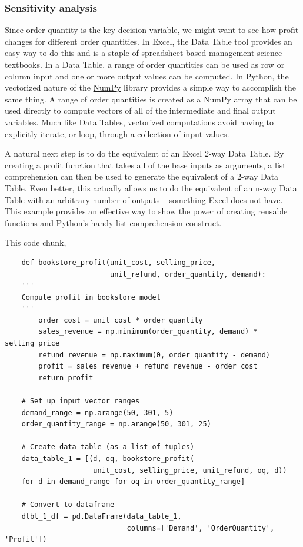 \documentclass[ited,blindrev]{informs3}              %
\begin{document}
\subsubsection{Sensitivity analysis}

Since order quantity is the key decision variable, we might want to see how profit changes for different order quantities. In Excel, the Data Table tool provides an easy way to do this and is a staple of spreadsheet based management science textbooks. In a Data Table, a range of order quantities can be used as row or column input and one or more output values can be computed. In Python, the vectorized nature of the \href{https://numpy.org/}{NumPy} library \cite{NumPy}provides a simple way to accomplish the same thing. A range of order quantities is created as a NumPy array that can be used directly to compute vectors of all of the intermediate and final output variables. Much like Data Tables, vectorized computations avoid having to explicitly iterate, or loop, through a collection of input values.

A natural next step is to do the equivalent of an Excel 2-way Data Table. By creating a profit function that takes all of the base inputs as arguments, a list comprehension can then be used to generate the equivalent of a 2-way Data Table. Even better, this actually allows us to do the equivalent of an n-way Data Table with an arbitrary number of outputs -- something Excel does not have. This example provides an effective way to show the power of creating reusable functions and Python's handy list comprehension construct.

This code chunk,

\begin{tcolorbox}[left=0mm]
\begin{verbatim}
	def bookstore_profit(unit_cost, selling_price, 
	                     unit_refund, order_quantity, demand):
	'''
	Compute profit in bookstore model
	'''
		order_cost = unit_cost * order_quantity
		sales_revenue = np.minimum(order_quantity, demand) * selling_price
		refund_revenue = np.maximum(0, order_quantity - demand)
		profit = sales_revenue + refund_revenue - order_cost
		return profit
	
	# Set up input vector ranges	
	demand_range = np.arange(50, 301, 5)
	order_quantity_range = np.arange(50, 301, 25)
	
	# Create data table (as a list of tuples)
	data_table_1 = [(d, oq, bookstore_profit(
	                 unit_cost, selling_price, unit_refund, oq, d)) 
	for d in demand_range for oq in order_quantity_range]
	
	# Convert to dataframe
	dtbl_1_df = pd.DataFrame(data_table_1, 
	                         columns=['Demand', 'OrderQuantity', 'Profit'])
	
\end{verbatim}
\end{tcolorbox}
\end{document}
